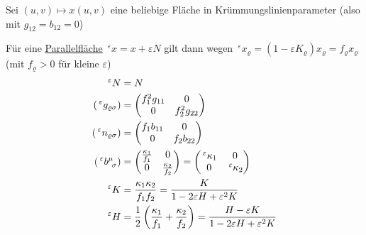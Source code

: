 Sei \((u,v)\mapsto x(u,v)\) eine beliebige Fläche in Krümmungslinienparameter (also mit \(g_{12} = b_{12} = 0\)) \par
Für eine \uline{Parallelfläche} \(\,^\varepsilon x = x + \varepsilon N\) gilt dann wegen \(\,^\varepsilon x_\varrho = (1 - \varepsilon K_\varrho) x_\varrho = f_\varrho x_\varrho\) (mit \(f_\varrho > 0\) für kleine \(\varepsilon\))
\begin{align*}
 \,^\varepsilon N &= N \\
 (\,^\varepsilon g_{\varrho \sigma}) &= \begin{pmatrix}
                                        f_1^2 g_{11} & 0 \\
                                        0 & f_2^2 g_{22}
                                       \end{pmatrix} \\
 (\,^\varepsilon n_{\varrho \sigma}) &= \begin{pmatrix}
                                        f_1 b_{11} & 0 \\
                                        0 & f_2 b_{22}
                                       \end{pmatrix} \\
 (\,^\varepsilon b^{\mu}_{\;\, \sigma}) &= \begin{pmatrix}
                                       \frac{\kappa_1}{f_1} & 0 \\
                                       0 & \frac{\kappa_2}{f_2}
                                      \end{pmatrix} = \begin{pmatrix}
                                                       \,^\varepsilon \kappa_1 & 0 \\
                                                       0 & \,^\varepsilon \kappa_2 
						       \end{pmatrix} \\
 \,^\varepsilon K &= \frac{\kappa_1 \kappa_2}{f_1 f_2} = \frac{K}{1 - 2 \varepsilon H + \varepsilon^2 K} \\
 \,^\varepsilon H &= \frac12 \left(\frac{\kappa_1}{f_1} + \frac{\kappa_2}{f_2}\right) = \frac{H - \varepsilon K}{1 - 2 \varepsilon H + \varepsilon^2 K}
\end{align*}

